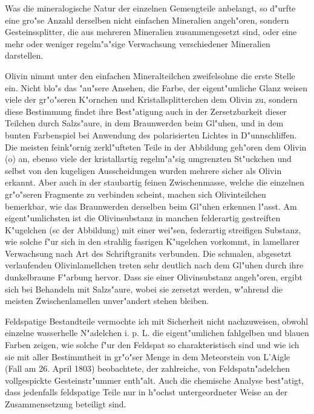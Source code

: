 \documentclass[a4paper, 11pt, oneside]{article}
\begin{document}
Was die mineralogische Natur der einzelnen Gemengteile anbelangt, so d"urfte eine gro"se Anzahl derselben nicht einfachen Mineralien angeh"oren, sondern Gesteinssplitter, die aus mehreren Mineralien zusammengesetzt sind, oder eine mehr oder weniger regelm"a"sige Verwachsung verschiedener Mineralien darstellen.

Olivin nimmt unter den einfachen Mineralteilchen zweifelsohne die erste Stelle ein. Nicht blo"s das "au"sere Ansehen, die Farbe, der eigent"umliche Glanz weisen viele der gr"o"seren K"ornchen und Kristallsplitterchen dem Olivin zu, sondern diese Bestimmung findet ihre Best"atigung auch in der Zersetzbarkeit dieser Teilchen durch Salzs"aure, in dem Braunwerden beim Gl"uhen, und in dem bunten Farbenspiel bei Anwendung des polarisierten Lichtes in D"unnschliffen. Die meisten feink"ornig zerkl"ufteten Teile in der Abbildung geh"oren dem Olivin (o) an, ebenso viele der kristallartig regelm"a"sig umgrenzten St"uckchen und selbst von den kugeligen Ausscheidungen wurden mehrere sicher als Olivin erkannt. Aber auch in der staubartig feinen Zwischenmasse, welche die einzelnen gr"o"seren Fragmente zu verbinden scheint, machen sich Olivinteilchen bemerkbar, wie das Braunwerden derselben beim Gl"uhen erkennen l"asst. Am eigent"umlichsten ist die Olivinsubstanz in manchen felderartig gestreiften K"ugelchen (sc der Abbildung) mit einer wei"sen, federartig streifigen Substanz, wie solche f"ur sich in den strahlig fasrigen K"ugelchen vorkommt, in lamellarer Verwachsung nach Art des Schriftgranits verbunden. Die schmalen, abgesetzt verlaufenden Olivinlamellchen treten sehr deutlich nach dem Gl"uhen durch ihre dunkelbraune F"arbung hervor. Dass sie einer Olivinsubstanz angeh"oren, ergibt sich bei Behandeln mit Salzs"aure, wobei sie zersetzt werden, w"ahrend die meisten Zwischenlamellen unver"andert stehen bleiben.

Feldspatige Bestandteile vermochte ich mit Sicherheit nicht nachzuweisen, obwohl einzelne wasserhelle N"adelchen i. p. L. die eigent"umlichen fahlgelben und blauen Farben zeigen, wie solche f"ur den Feldspat so charakteristisch sind und wie ich sie mit aller Bestimmtheit in gr"o"ser Menge in dem Meteorstein von L'Aigle (Fall am 26. April 1803) beobachtete, der zahlreiche, von Feldspatn"adelchen vollgespickte Gesteinstr"ummer enth"alt. Auch die chemische Analyse best"atigt, dass jedenfalls feldspatige Teile nur in h"ochst untergeordneter Weise an der Zusammensetzung beteiligt sind.
\end{document}
